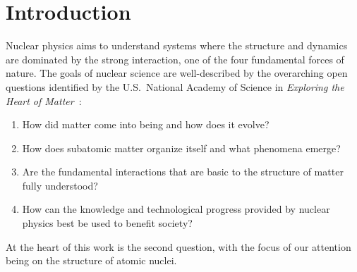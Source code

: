 \chapter{Introduction}

Nuclear physics aims to understand systems
where the structure and dynamics are dominated by the strong interaction,
one of the four fundamental forces of nature.
The goals of nuclear science are well-described by the overarching open questions
identified by the U.S.~National Academy of Science in \textit{Exploring the Heart of Matter}~\cite{NRC13heartofmatter}:
\begin{enumerate}
  \item How did matter come into being and how does it evolve?
  \item How does subatomic matter organize itself and what phenomena emerge?
  \item Are the fundamental interactions that are basic to the structure of matter fully understood?
  \item How can the knowledge and technological progress provided by nuclear physics best be used to benefit society?
\end{enumerate}
At the heart of this work is the second question,
with the focus of our attention being on the structure of atomic nuclei.

